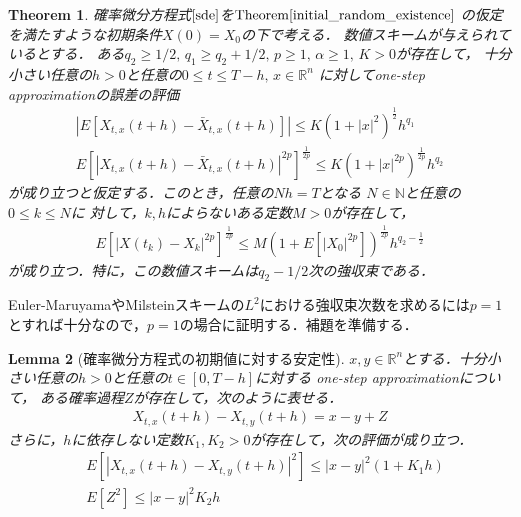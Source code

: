 \documentclass[dvipdfmx,autodetect-engine]{jsarticle}
\newtheorem{theorem}{Theorem}[section]
\newtheorem{lemma}[theorem]{Lemma}
\theoremstyle{remark}
\theoremstyle{definition}
\newcommand{\R}{\mathbb{R}}
\newcommand{\N}{\mathbb{N}}
\newcommand{\abs}[1]{\left\lvert#1\right\rvert}
\begin{document}
\begin{theorem}\label{fundamental_thm_for_osa}
    確率微分方程式$\eqref{sde}$を$\mathrm{Theorem}\ref{initial_random_existence}$
    の仮定を満たすような初期条件$X(0)=X_{0}$の下で考える．
    数値スキームが与えられているとする．
    ある$q_{2}\geq 1/2,\, q_{1} \geq q_{2} + 1/2 ,\, 
    p\geq 1,\, \alpha \geq 1,\, K>0$が存在して，
    十分小さい任意の$h>0$と任意の$0\leq t\leq T-h,\, x\in \R^{n}$
    に対してone-step approximationの誤差の評価
    \begin{align}
        \abs{E[X_{t,x}(t+h) - \bar{X}_{t,x}(t+h)]} 
        \leq K(1+\abs{x}^{2})^{\frac{1}{2}} h^{q_{1}} \\
        E[\abs{X_{t,x}(t+h)- \bar{X}_{t,x}(t+h)}^{2p}]^{\frac{1}{2p}}
        \leq K(1+\abs{x}^{2p})^{\frac{1}{2p}} h^{q_{2}}
    \end{align}
    が成り立つと仮定する．このとき，任意の$Nh=T$となる
    $N \in \N$と任意の$0\leq k\leq N$に
    対して，$k,h$によらないある定数$M>0$が存在して，
    \begin{align}
        E[\abs{X(t_{k}) - X_{k}}^{2p}]^{\frac{1}{2p}}
        \leq M(1+E[\abs{X_{0}}^{2p}])^{\frac{1}{2p}} h^{q_{2} - \frac{1}{2}}
    \end{align}
    が成り立つ．特に，この数値スキームは$q_{2}-1/2$次の強収束である．
\end{theorem}


Euler-MaruyamaやMilsteinスキームの$L^2$における強収束次数を求めるには$p=1$
とすれば十分なので，$p=1$の場合に証明する．補題を準備する．


\begin{lemma}[確率微分方程式の初期値に対する安定性]\label{sde_stability_initial}
    $x,y \in \R^{n}$とする．十分小さい任意の$h>0$と任意の$t \in [0,T-h]$に対する
    one-step approximationについて，
    ある確率過程$Z$が存在して，次のように表せる．
    \begin{align}
        X_{t,x}(t+h)-X_{t,y}(t+h) = x - y + Z
    \end{align}
    さらに，$h$に依存しない定数$K_{1},K_{2}>0$が存在して，次の評価が成り立つ．
    \begin{align}
        &E[\abs{X_{t,x}(t+h)-X_{t,y}(t+h)}^{2}] \leq
        \abs{x-y}^{2} (1+K_{1}h) \\
        &E[Z^{2}] \leq \abs{x-y}^{2} K_{2}h
    \end{align}
\end{lemma}
\end{document}
